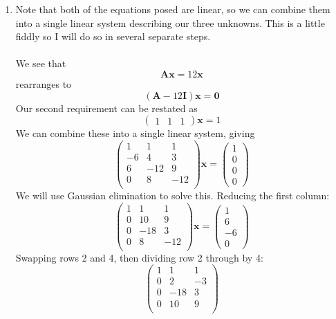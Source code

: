 \documentclass{article}
\newcommand{\chapternumber}{2}
\newenvironment{QandA}{\begin{enumerate}[label=\chapternumber.\arabic*]\bfseries\boldmath}
	{\end{enumerate}}
\newenvironment{answered}{\par\bigskip\normalfont\unboldmath}{}
\begin{document}
\begin{QandA}
\begin{answered}
		\end{answered}
		
		\item 
		\begin{answered}
			Note that both of the equations posed are linear, so we can combine them into a single linear system describing our three unknowns. This is a little fiddly so I will do so in several separate steps.\\
			\\
			We see that
			\[\textbf{Ax}=12\textbf{x}\]
			rearranges to
			\[(\textbf{A}-12\textbf{I})\textbf{x} = \textbf{0}\]
			Our second requirement can be restated as
			\[\begin{pmatrix}
				1 & 1 & 1
			\end{pmatrix}
			\textbf{x} = 1\]
			We can combine these into a single linear system, giving
			\[
			\begin{pmatrix}
				1 & 1 & 1 \\
				-6 & 4 & 3 \\
				6 & -12 & 9 \\
				0 & 8 & -12 \\
			\end{pmatrix}
							\textbf{x}
			=
			\begin{pmatrix}
				1 \\ 0 \\ 0 \\ 0
			\end{pmatrix}
			\]
			We will use Gaussian elimination to solve this. Reducing the first column:
			\[
			\begin{pmatrix}
				1 & 1 & 1 \\
				0 & 10 & 9 \\
				0 & -18 & 3 \\
				0 & 8 & -12 \\
			\end{pmatrix}
			\textbf{x}
			=
			\begin{pmatrix}
				1 \\ 6 \\ -6 \\ 0
			\end{pmatrix}
			\]
			Swapping rows 2 and 4, then dividing row 2 through by 4:
			\[
			\begin{pmatrix}
				1 & 1 & 1 \\
				0 & 2 & -3 \\
				0 & -18 & 3 \\
				0 & 10 & 9 \\
			\end{pmatrix}
\]
\end{answered}
\end{QandA}
\end{document}
